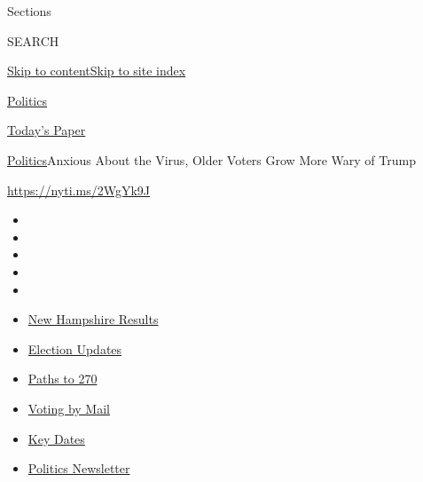 Sections

SEARCH

\protect\hyperlink{site-content}{Skip to
content}\protect\hyperlink{site-index}{Skip to site index}

\href{https://www.nytimes3xbfgragh.onion/section/politics}{Politics}

\href{https://myaccount.nytimes3xbfgragh.onion/auth/login?response_type=cookie\&client_id=vi}{}

\href{https://www.nytimes3xbfgragh.onion/section/todayspaper}{Today's
Paper}

\href{/section/politics}{Politics}\textbar{}Anxious About the Virus,
Older Voters Grow More Wary of Trump

\url{https://nyti.ms/2WgYk9J}

\begin{itemize}
\item
\item
\item
\item
\item
\end{itemize}

\begin{itemize}
\item
  \href{https://www.nytimes3xbfgragh.onion/interactive/2020/09/08/us/elections/results-new-hampshire-primary-elections.html?action=click\&pgtype=Article\&state=default\&region=TOP_BANNER\&context=storylines_menu}{New
  Hampshire Results}
\item
  \href{https://www.nytimes3xbfgragh.onion/live/2020/09/09/us/trump-vs-biden?action=click\&pgtype=Article\&state=default\&region=TOP_BANNER\&context=storylines_menu}{Election
  Updates}
\item
  \href{https://www.nytimes3xbfgragh.onion/interactive/2020/us/elections/election-states-biden-trump.html?action=click\&pgtype=Article\&state=default\&region=TOP_BANNER\&context=storylines_menu}{Paths
  to 270}
\item
  \href{https://www.nytimes3xbfgragh.onion/interactive/2020/08/31/us/politics/vote-by-mail-deadlines.html?action=click\&pgtype=Article\&state=default\&region=TOP_BANNER\&context=storylines_menu}{Voting
  by Mail}
\item
  \href{https://www.nytimes3xbfgragh.onion/interactive/2019/us/elections/2020-presidential-election-calendar.html?action=click\&pgtype=Article\&state=default\&region=TOP_BANNER\&context=storylines_menu}{Key
  Dates}
\item
  \href{https://www.nytimes3xbfgragh.onion/newsletters/politics?action=click\&pgtype=Article\&state=default\&region=TOP_BANNER\&context=storylines_menu}{Politics
  Newsletter}
\end{itemize}

